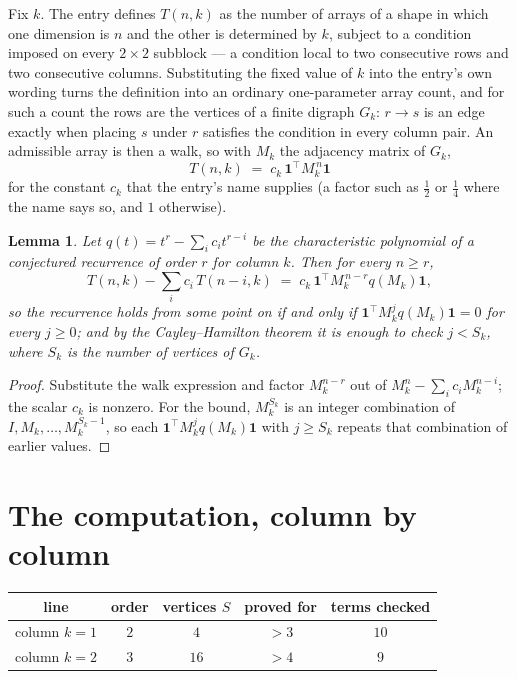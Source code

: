 \documentclass[11pt,a4paper]{article}
\theoremstyle{plain}
\newtheorem{lemma}[theorem]{Lemma}
\theoremstyle{definition}
\begin{document}
Fix $k$. The entry defines $T(n,k)$ as the number of arrays of a shape in which one dimension
is $n$ and the other is determined by $k$, subject to a condition imposed on every
$2\times2$ subblock --- a condition local to two consecutive rows and two consecutive columns.
Substituting the fixed value of $k$ into the entry's own wording turns the definition into an
ordinary one-parameter array count, and for such a count the rows are the vertices of a finite
digraph $G_k$: $r\to s$ is an edge exactly when placing $s$ under $r$ satisfies the condition
in every column pair. An admissible array is then a walk, so with $M_k$ the adjacency matrix
of $G_k$,
\[
T(n,k)\;=\;c_k\,\mathbf{1}^{\!\top}M_k^{\,n}\mathbf{1}
\]
for the constant $c_k$ that the entry's name supplies (a factor such as $\tfrac12$ or
$\tfrac14$ where the name says so, and $1$ otherwise).

\begin{lemma}\label{lem:crit}
Let $q(t)=t^{r}-\sum_i c_it^{r-i}$ be the characteristic polynomial of a conjectured
recurrence of order $r$ for column $k$. Then for every $n\ge r$,
\[
T(n,k)-\sum_i c_i\,T(n-i,k)\;=\;c_k\,\mathbf{1}^{\!\top}M_k^{\,n-r}q(M_k)\mathbf{1},
\]
so the recurrence holds from some point on if and only if
$\mathbf{1}^{\!\top}M_k^{j}q(M_k)\mathbf{1}=0$ for every $j\ge0$; and by the
Cayley--Hamilton theorem it is enough to check $j<S_k$, where $S_k$ is the number of vertices
of $G_k$.
\end{lemma}

\begin{proof}
Substitute the walk expression and factor $M_k^{n-r}$ out of $M_k^{n}-\sum_ic_iM_k^{n-i}$;
the scalar $c_k$ is nonzero. For the bound, $M_k^{S_k}$ is an integer combination of
$I,M_k,\dots,M_k^{S_k-1}$, so each $\mathbf{1}^{\!\top}M_k^{j}q(M_k)\mathbf{1}$ with
$j\ge S_k$ repeats that combination of earlier values.
\end{proof}

\section{The computation, column by column}

\begin{center}
\begin{tabular}{ccccc}
line & order & vertices $S$ & proved for & terms checked \\ \hline
column $k$$=1$ & $2$ & $4$ & $>3$ & $10$ \\
column $k$$=2$ & $3$ & $16$ & $>4$ & $9$ \\
\end{tabular}
\end{center}
\end{document}
